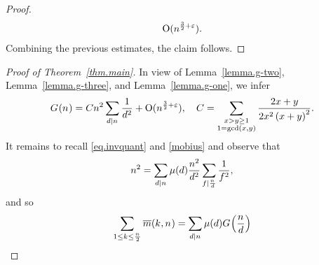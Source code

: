 \begin{proof}
\begin{align*}
        \operatorname{O}(n_{}^{\frac32 + \varepsilon})
        .
    \end{align*}
    Combining the previous estimates, the claim follows. %
  \end{proof}

  \begin{proof}[Proof of Theorem~\ref{thm.main}]
    In view of Lemma~\ref{lemma.g-two}, Lemma~\ref{lemma.g-three}, and
    Lemma~\ref{lemma.g-one}, we infer
    \[
      \TheQuantityOf{\Size}
      =
      \TheZetaConst\Size^2
      \Sum[\TheDivisor\divides\Size]{
        \frac{1}{\TheDivisor^2}
      }
      +
      \BigO{\Size^{\frac32 + \TheEpsilon}}, \quad  \TheZetaConst
      =
      \Sum[\substack{
        \LeftA>\RightA\geq 1 \\
        1 = \gcdOf{\LeftA,\RightA}
      }]{
        \frac{2\LeftA+\RightA}{2\LeftA^2\Parens{\LeftA+\RightA}^2}
      }.
    \]
    It remains to recall \eqref{eq.invquant} and \eqref{mobius} and observe that 
    \[
      \Size^2
      =
      \Sum[\TheDivisor\divides\Size]{
        \MoebiusOf{\TheDivisor}
        \frac{\Size^2}{\TheDivisor^2}
        \Sum[\AltDivisor\divides\frac{\Size}{\TheDivisor}]{
          \frac{1}{\AltDivisor^2}
        }
      }
      ,
    \]
    and so 
    \[
      \Sum[{
        \substack{
          1\leq\Shift\leq\frac{\Size}{2}\\
        }
      }]{
        \RemainderSumOf{\Shift}{\Size}
      }
      =  \Sum[\TheDivisor\divides\Size]{
        \MoebiusOf{\TheDivisor}
        \TheQuantityOf{\frac{\Size}{\TheDivisor}}
}\]
\end{proof}
